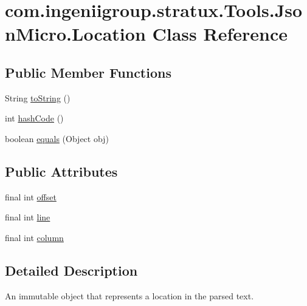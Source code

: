 \hypertarget{classcom_1_1ingeniigroup_1_1stratux_1_1_tools_1_1_json_micro_1_1_location}{}\section{com.\+ingeniigroup.\+stratux.\+Tools.\+Json\+Micro.\+Location Class Reference}
\label{classcom_1_1ingeniigroup_1_1stratux_1_1_tools_1_1_json_micro_1_1_location}
\subsection*{Public Member Functions}
\begin{DoxyCompactItemize}
\item 
String \hyperlink{classcom_1_1ingeniigroup_1_1stratux_1_1_tools_1_1_json_micro_1_1_location_a90b41e449384d5811f3190a8b49815b0}{to\+String} ()
\item 
int \hyperlink{classcom_1_1ingeniigroup_1_1stratux_1_1_tools_1_1_json_micro_1_1_location_a01aa87f91688144f7599295dcc380dce}{hash\+Code} ()
\item 
boolean \hyperlink{classcom_1_1ingeniigroup_1_1stratux_1_1_tools_1_1_json_micro_1_1_location_a65d83bf8cdb5405d46940936581b60f9}{equals} (Object obj)
\end{DoxyCompactItemize}
\subsection*{Public Attributes}
\begin{DoxyCompactItemize}
\item 
final int \hyperlink{classcom_1_1ingeniigroup_1_1stratux_1_1_tools_1_1_json_micro_1_1_location_aa67ed089394123d36c7c679fea7c5c65}{offset}
\item 
final int \hyperlink{classcom_1_1ingeniigroup_1_1stratux_1_1_tools_1_1_json_micro_1_1_location_a8bc9ff4f93a6568f160bfeefb7553dbb}{line}
\item 
final int \hyperlink{classcom_1_1ingeniigroup_1_1stratux_1_1_tools_1_1_json_micro_1_1_location_a10e463acdff878af56196fc5b4e6b10b}{column}
\end{DoxyCompactItemize}


\subsection{Detailed Description}
An immutable object that represents a location in the parsed text. 

